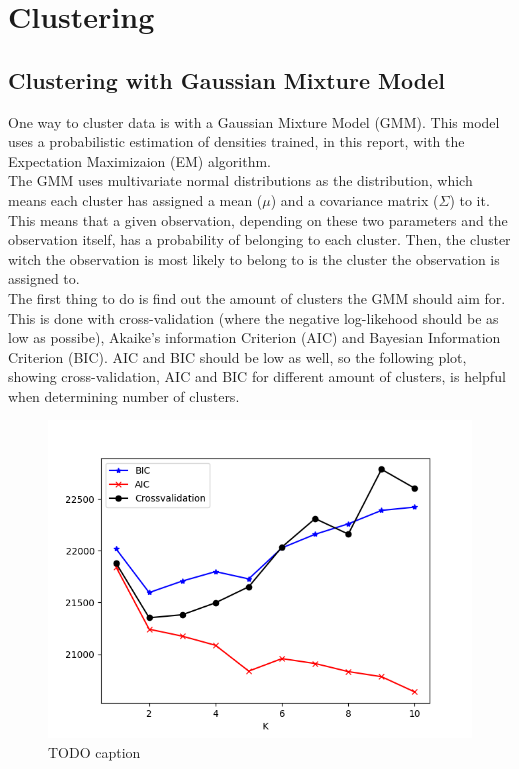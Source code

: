\section{Clustering}


\subsection{Clustering with Gaussian Mixture Model}
One way to cluster data is with a Gaussian Mixture Model (GMM). This model uses a
probabilistic estimation of densities trained, in this report, with the
Expectation Maximizaion (EM) algorithm.\\
The GMM uses multivariate normal distributions as the distribution, which means
each cluster has assigned a mean ($\mu$) and a covariance matrix ($\Sigma$) to it.
This means that a given observation, depending on these two parameters and the
observation itself, has a probability of belonging to each cluster. Then, the
cluster witch the observation is most likely to belong to is the cluster the
observation is assigned to.\\
The first thing to do is find out the amount of clusters the GMM should aim for.
This is done with cross-validation (where the negative log-likehood should be
as low as possibe), Akaike's information Criterion (AIC) and Bayesian Information
Criterion (BIC). AIC and BIC should be low as well, so the following plot, showing
cross-validation, AIC and BIC for different amount of clusters, is helpful when
determining number of clusters.\\
\begin{figure}[htbp]
  \centering
  \includegraphics[width=\textwidth]{Figure_1.png}
  \caption{TODO caption}
\end{figure}
